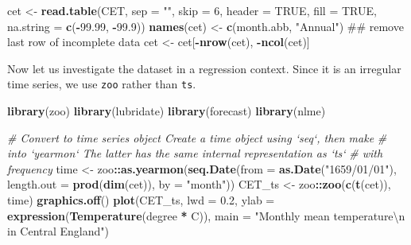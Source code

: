 \documentclass[]{book}
\newenvironment{Shaded}{\begin{snugshade}}{\end{snugshade}}
\newcommand{\KeywordTok}[1]{\textcolor[rgb]{0.13,0.29,0.53}{\textbf{#1}}}
\newcommand{\DataTypeTok}[1]{\textcolor[rgb]{0.13,0.29,0.53}{#1}}
\newcommand{\DecValTok}[1]{\textcolor[rgb]{0.00,0.00,0.81}{#1}}
\newcommand{\FloatTok}[1]{\textcolor[rgb]{0.00,0.00,0.81}{#1}}
\newcommand{\CharTok}[1]{\textcolor[rgb]{0.31,0.60,0.02}{#1}}
\newcommand{\StringTok}[1]{\textcolor[rgb]{0.31,0.60,0.02}{#1}}
\newcommand{\CommentTok}[1]{\textcolor[rgb]{0.56,0.35,0.01}{\textit{#1}}}
\newcommand{\OtherTok}[1]{\textcolor[rgb]{0.56,0.35,0.01}{#1}}
\newcommand{\OperatorTok}[1]{\textcolor[rgb]{0.81,0.36,0.00}{\textbf{#1}}}
\newcommand{\NormalTok}[1]{#1}
\begin{document}
\begin{Shaded}
\begin{Highlighting}[]
\NormalTok{cet <-}\StringTok{ }\KeywordTok{read.table}\NormalTok{(CET, }\DataTypeTok{sep =} \StringTok{""}\NormalTok{, }\DataTypeTok{skip =} \DecValTok{6}\NormalTok{, }\DataTypeTok{header =} \OtherTok{TRUE}\NormalTok{, }\DataTypeTok{fill =} \OtherTok{TRUE}\NormalTok{, }\DataTypeTok{na.string =} \KeywordTok{c}\NormalTok{(}\OperatorTok{-}\FloatTok{99.99}\NormalTok{, }
    \OperatorTok{-}\FloatTok{99.9}\NormalTok{))}
\KeywordTok{names}\NormalTok{(cet) <-}\StringTok{ }\KeywordTok{c}\NormalTok{(month.abb, }\StringTok{"Annual"}\NormalTok{)}
\NormalTok{## remove last row of incomplete data}
\NormalTok{cet <-}\StringTok{ }\NormalTok{cet[}\OperatorTok{-}\KeywordTok{nrow}\NormalTok{(cet), }\OperatorTok{-}\KeywordTok{ncol}\NormalTok{(cet)]}
\end{Highlighting}
\end{Shaded}

Now let us investigate the dataset in a regression context. Since it is
an irregular time series, we use \texttt{zoo} rather than \texttt{ts}.

\begin{Shaded}
\begin{Highlighting}[]
\KeywordTok{library}\NormalTok{(zoo)}
\KeywordTok{library}\NormalTok{(lubridate)}
\KeywordTok{library}\NormalTok{(forecast)}
\KeywordTok{library}\NormalTok{(nlme)}
\end{Highlighting}
\end{Shaded}

\begin{Shaded}
\begin{Highlighting}[]
\CommentTok{# Convert to time series object Create a time object using `seq`, then make}
\CommentTok{# into `yearmon` The latter has the same internal representation as `ts`}
\CommentTok{# with frequency}
\NormalTok{time <-}\StringTok{ }\NormalTok{zoo}\OperatorTok{::}\KeywordTok{as.yearmon}\NormalTok{(}\KeywordTok{seq.Date}\NormalTok{(}\DataTypeTok{from =} \KeywordTok{as.Date}\NormalTok{(}\StringTok{"1659/01/01"}\NormalTok{), }\DataTypeTok{length.out =} \KeywordTok{prod}\NormalTok{(}\KeywordTok{dim}\NormalTok{(cet)), }
    \DataTypeTok{by =} \StringTok{"month"}\NormalTok{))}
\NormalTok{CET_ts <-}\StringTok{ }\NormalTok{zoo}\OperatorTok{::}\KeywordTok{zoo}\NormalTok{(}\KeywordTok{c}\NormalTok{(}\KeywordTok{t}\NormalTok{(cet)), time)}
\KeywordTok{graphics.off}\NormalTok{()}
\KeywordTok{plot}\NormalTok{(CET_ts, }\DataTypeTok{lwd =} \FloatTok{0.2}\NormalTok{, }\DataTypeTok{ylab =} \KeywordTok{expression}\NormalTok{(}\KeywordTok{Temperature}\NormalTok{(degree }\OperatorTok{*}\StringTok{ }\NormalTok{C)), }\DataTypeTok{main =} \StringTok{"Monthly mean temperature}\CharTok{\textbackslash{}n}\StringTok{ in Central England"}\NormalTok{)}
\end{Highlighting}
\end{Shaded}
\end{document}
